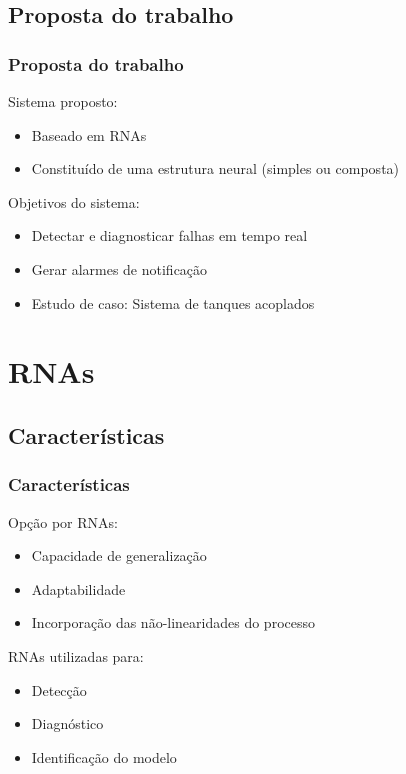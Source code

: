 \documentclass{beamer}
\begin{document}
\subsection{Proposta do trabalho}
\begin{frame}
    \frametitle{Proposta do trabalho}

    Sistema proposto:

\begin{itemize}
    \item Baseado em RNAs
    \item Constituído de uma estrutura neural (simples ou composta)
\end{itemize}

    Objetivos do sistema:

\begin{itemize}
    \item Detectar e diagnosticar falhas em tempo real
    \item Gerar alarmes de notificação
    \item Estudo de caso: Sistema de tanques acoplados
\end{itemize}

\end{frame}

\section{RNAs}
\subsection{Características}
\begin{frame}
    \frametitle{Características}

    Opção por RNAs:

\begin{itemize}
    \item Capacidade de generalização
    \item Adaptabilidade
    \item Incorporação das não-linearidades do processo
\end{itemize}
    
    RNAs utilizadas para:

\begin{itemize}
    \item Detecção
    \item Diagnóstico
    \item Identificação do modelo
\end{itemize}
\end{frame}
\end{document}
